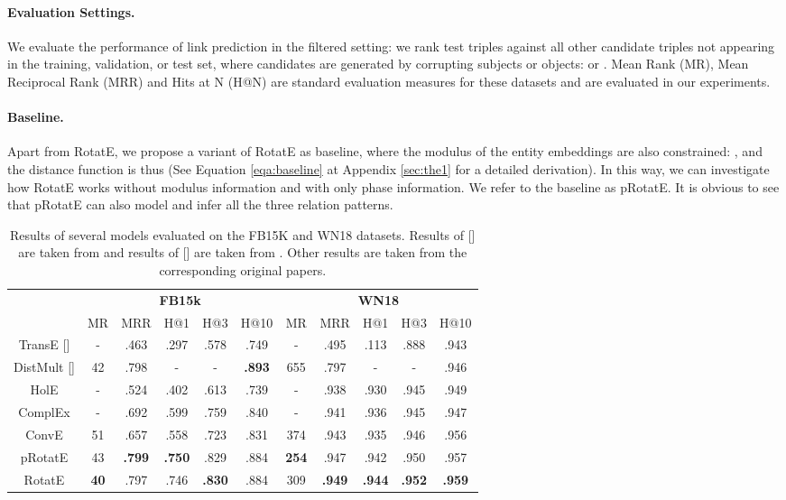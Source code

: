\documentclass{article} \usepackage{iclr2019_conference,times}
\def\method{RotatE}
\def\baseline{pRotatE}
\begin{document}
\paragraph{Evaluation Settings.} We evaluate the performance of link prediction in the filtered setting: we rank test triples against all other candidate triples not appearing in the training, validation, or test set, where candidates are generated by corrupting subjects or objects:  or . Mean Rank (MR), Mean Reciprocal Rank (MRR) and Hits at N (H@N) are standard evaluation measures for these datasets and are evaluated in our experiments.

\paragraph{Baseline.} Apart from \method{}, we propose a variant of \method{} as baseline, where the modulus of the entity embeddings are also constrained: , and the distance function is thus  (See Equation \ref{eqa:baseline} at Appendix \ref{sec:the1} for a detailed derivation). In this way, we can investigate how \method{} works without modulus information and with only phase information. We refer to the baseline as \baseline{}. It is obvious to see that \baseline{} can also model and infer all the three relation patterns.

\begin{table}[t]
\centering
\small
\begin{tabular}{|c|c c c c c|c c c c c|}
\hline
& \multicolumn{5}{c|}{\textbf{FB15k}} & \multicolumn{5}{c|}{\textbf{WN18}}\\
\cline{2-11}
& MR & MRR & H@1 & H@3 & H@10 & MR & MRR & H@1 & H@3 & H@10 \\
\hline
TransE [] & - & .463 & .297 & .578 & .749 & - & .495 & .113 & .888 & .943\\
\hline
DistMult [] & 42 & .798 & - & - & \textbf{.893} & 655 & .797 & - & - & .946\\
\hline
HolE & - & .524 & .402 & .613 & .739 & - & .938 & .930 & .945 & .949\\
\hline
ComplEx & - & .692 & .599 & .759 & .840 & - & .941 & .936 & .945 & .947\\
\hline
ConvE & 51 & .657 & .558 & .723 & .831 & 374 &  .943 & .935 & .946 & .956\\
\hline
\hline
\baseline{} & 43 & \textbf{.799} & \textbf{.750} & .829 & .884 & \textbf{254} & .947 & .942 & .950 & .957\\
\hline
\method{} & \textbf{40} & .797 & .746 & \textbf{.830} & .884 & 309 & \textbf{.949} & \textbf{.944} & \textbf{.952} & \textbf{.959}\\
\hline
\end{tabular}
\caption{Results of several models evaluated on the FB15K and WN18 datasets. Results of [] are taken from  \citep{nickel2016holographic} and results of [] are taken from  \citep{kadlec2017knowledge}. Other results are taken from the corresponding original papers.}
\label{tab:main1}
\end{table}
\end{document}
